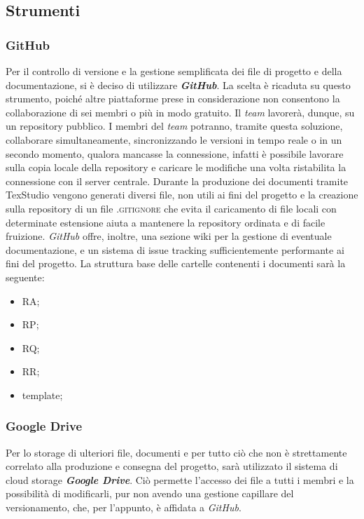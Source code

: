 	\subsection{Strumenti}

		\subsubsection{GitHub}
		Per il controllo di versione e la gestione semplificata dei file di progetto e della documentazione, si è deciso di utilizzare \textbf{\textit{GitHub}}. La scelta è ricaduta su questo strumento, poiché altre piattaforme prese in considerazione non consentono la collaborazione di sei membri o più in modo gratuito. Il \textit{team} lavorerà, dunque, su un repository pubblico. I membri del \textit{team} potranno, tramite questa soluzione, collaborare simultaneamente, sincronizzando le versioni in tempo reale o in un secondo momento, qualora mancasse la connessione, infatti è possibile lavorare sulla copia locale della repository e caricare le modifiche una volta ristabilita la connessione con il server centrale. Durante la produzione dei documenti tramite TexStudio vengono generati diversi file, non utili ai fini del progetto e la creazione sulla repository di un file \textsc{.gitignore} che evita il caricamento di file locali con determinate estensione aiuta a mantenere la repository ordinata e di facile fruizione. \textit{GitHub} offre, inoltre, una sezione wiki per la gestione di eventuale documentazione, e un sistema di issue tracking sufficientemente performante ai fini del progetto. 
		La struttura base delle cartelle contenenti i documenti sarà la seguente:
		\begin{itemize}
			\item RA;
			\item RP;
			\item RQ;
			\item RR;
			\item template;
		\end{itemize}

		\subsubsection{Google Drive}
		Per lo storage di ulteriori file, documenti e per tutto ciò che non è strettamente correlato alla produzione e consegna del progetto, sarà utilizzato il sistema di cloud storage \textbf{\textit{Google Drive}}. Ciò permette l'accesso dei file a tutti i membri e la possibilità di modificarli, pur non avendo una gestione capillare del versionamento, che, per l'appunto, è affidata a \textit{GitHub}.


